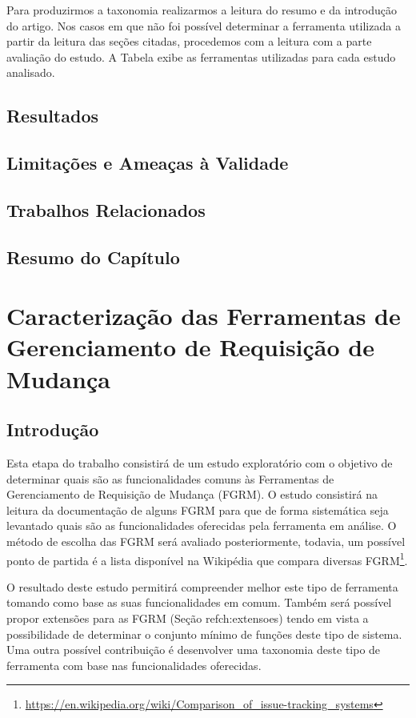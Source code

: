 \documentclass[msc]{ppgccufmg} %
\begin{document}
Para produzirmos a taxonomia realizarmos a leitura do resumo e da introdução do artigo. Nos casos em que não foi possível determinar a ferramenta utilizada a partir da leitura das seções citadas, procedemos com a leitura com a parte avaliação do estudo. A Tabela exibe as ferramentas utilizadas para cada estudo analisado.


\section{Resultados}
\label{sec:resutaldos}

\section{Limitações e Ameaças à Validade}

\section{Trabalhos Relacionados}

\section{Resumo do Capítulo}

\chapter{Caracterização das Ferramentas de Gerenciamento de Requisição de Mudança}
\label{ch:caracterizacao}


\section{Introdução}

Esta etapa do trabalho consistirá de um estudo exploratório com o objetivo de determinar quais são as funcionalidades comuns às Ferramentas de Gerenciamento de Requisição de Mudança (FGRM). O estudo consistirá na leitura da documentação de alguns FGRM para que de forma sistemática seja levantado quais são as funcionalidades oferecidas pela ferramenta em análise. O método de escolha das FGRM será avaliado posteriormente, todavia, um possível ponto de partida é a lista disponível na Wikipédia que compara diversas FGRM\footnote{\url{https://en.wikipedia.org/wiki/Comparison_of_issue-tracking_systems}}.

O resultado deste estudo permitirá compreender melhor este tipo de ferramenta tomando como base as suas funcionalidades em comum. Também será possível propor extensões para as FGRM (Seção ref{ch:extensoes}) tendo em vista a possibilidade de determinar o conjunto mínimo de funções deste tipo de sistema. Uma outra possível contribuição é desenvolver uma taxonomia deste tipo de ferramenta com base nas funcionalidades oferecidas.
\end{document}
